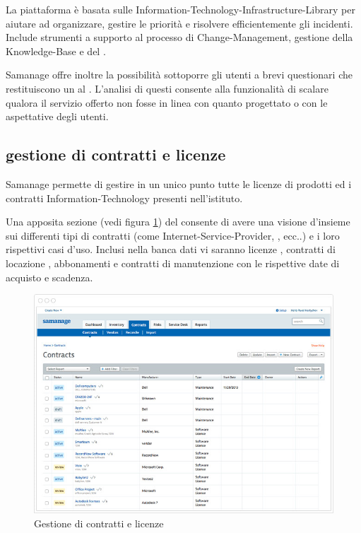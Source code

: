 La piattaforma è basata sulle  \ac{Information-Technology-Infrastructure-Library} per aiutare ad organizzare, gestire le priorità e risolvere efficientemente gli incidenti. Include strumenti a supporto al processo di \ac{Change-Management}, gestione della \ac{Knowledge-Base} e del .

Samanage offre inoltre la possibilità sottoporre gli utenti a brevi questionari che restituiscono un  al . L'analisi di questi  consente alla funzionalità di scalare qualora il servizio offerto non fosse in linea con quanto progettato o con le aspettative degli utenti.

\subsection[Gestione di contratti e e licenze]{gestione di contratti e licenze}
\label{sd-samanage-contract-license}
Samanage permette di gestire in un unico punto tutte le licenze di prodotti ed i contratti \acs{Information-Technology} presenti nell'istituto.

Una apposita sezione (vedi figura \ref{sd-samanage-contract-license-img}) del  consente di avere una visione d'insieme sui differenti tipi di contratti (come \acs{Internet-Service-Provider}, , ecc..) e i loro rispettivi casi d'uso. Inclusi nella banca dati vi saranno licenze , contratti di locazione , abbonamenti e contratti di manutenzione con le rispettive date di acquisto e scadenza.

\begin{figure}[htbp]
\centering
\includegraphics[scale=0.6]{Images/samanage/Contract_license.png}
\caption{Gestione di contratti e licenze}
\label{sd-samanage-contract-license-img}
\end{figure}

